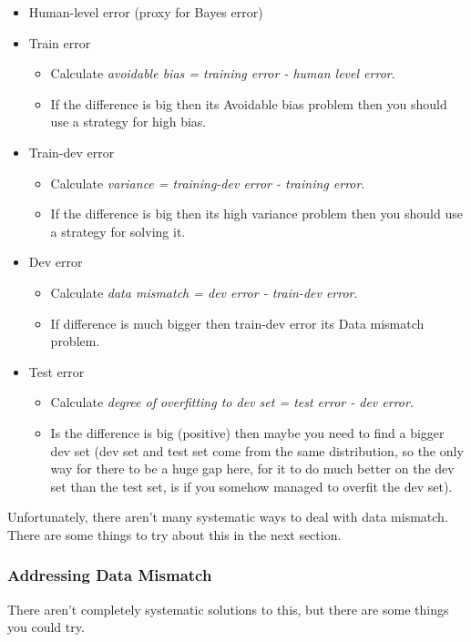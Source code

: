 \begin{itemize}
    \item Human-level error (proxy for Bayes error)
    \item Train error
    \begin{itemize}
        \item Calculate \textit{avoidable bias = training error - human level error}.
        \item If the difference is big then its Avoidable bias problem then you should use a strategy for high bias.
    \end{itemize}
    \item Train-dev error
    \begin{itemize}
        \item Calculate \textit{variance = training-dev error - training error}.
        \item If the difference is big then its high variance problem then you should use a strategy for solving it.
    \end{itemize}
    \item Dev error
    \begin{itemize}
        \item Calculate \textit{data mismatch = dev error - train-dev error}.
        \item If difference is much bigger then train-dev error its Data mismatch problem.
    \end{itemize}
    \item Test error
    \begin{itemize}
        \item Calculate \textit{degree of overfitting to dev set = test error - dev error}.
        \item Is the difference is big (positive) then maybe you need to find a bigger dev set (dev set and test set come from the same distribution, so the only way for there to be a huge gap here, for it to do much better on the dev set than the test set, is if you somehow managed to overfit the dev set).
    \end{itemize}
\end{itemize}

Unfortunately, there aren't many systematic ways to deal with data mismatch. There are some things to try about this in the next section.

\subsubsection{Addressing Data Mismatch}
There aren't completely systematic solutions to this, but there are some things you could try.

